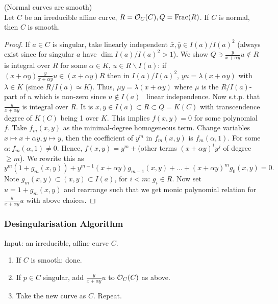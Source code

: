\documentclass[a4paper,11pt]{article}
\begin{document}
			\begin{thm}(Normal curves are smooth)\\
				Let $C$ be an irreducible affine curve, $R=\mathcal{O}_C(C), Q=\operatorname{Frac}(R)$. If $C$ is normal, then $C$ is smooth.
			\end{thm}
			\begin{proof}
				If $a\in C$ is singular, take linearly independent $\bar{x}, \bar{y}\in I(a)/I(a)^2$ (always exist since for singular $a$ have $\dim I(a)/I(a)^2>1$). We show $Q\ni\frac{y}{x+\alpha y}u\notin R$ is integral over $R$ for some $\alpha\in K$, $u\in R\backslash I(a)$: if $(x+\alpha y)\frac{y}{x+\alpha y}u\in (x+\alpha y)R$ then in $I(a)/I(a)^2$, $yu=\lambda(x+\alpha y)$ with $\lambda\in K$ (since $R/I(a)\simeq K$). Thus, $\mu y=\lambda(x+\alpha y)$ where $\mu$ is the $R/I(a)$-part of $u$ which is non-zero since $u\notin I(a)$ \contradiction\ linear independence. Now s.t.p. that $\frac{y}{x+\alpha y}$ is integral over $R$. It is $x,y\in I(a)\subset R\subset Q=K(C)$ with transcendence degree of $K(C)$ being 1 over $K$. This implies $f(x,y)=0$ for some polynomial $f$. Take $f_m(x,y)$ as the minimal-degree homogeneous term. Change variables $x\mapsto x+\alpha y, y\mapsto y$, then the coefficient of $y^m$ in $f_m(x,y)$ is $f_m(\alpha,1)$. For some $\alpha: f_m(\alpha,1)\neq0$. Hence, $f(x,y)=y^m+$(other terms $(x+\alpha y)^iy^j$ of degree $\ge m$). We rewrite this as 
				\begin{equation*}
					y^m(1+g_m(x,y))+y^{m-1}(x+\alpha y)g_{m-1}(x,y)+\dots+(x+\alpha y)^mg_0(x,y)=0.
				\end{equation*}
				Note $g_m(x,y)\subset(x,y)\subset I(a)$, for $i<m$: $g_i\in R$. Now set $u=1+g_m(x,y)$ and rearrange such that we get monic polynomial relation for $\frac{y}{x+\alpha y}u$ with above choices.
			\end{proof}

			\subsubsection*{Desingularisation Algorithm}

				Input: an irreducible, affine curve $C$.
				\begin{enumerate}
					\item If $C$ is smooth: done.
					\item If $p\in C$ singular, add $\frac{y}{x+\alpha y}u$ to $\mathcal{O}_C(C)$ as above.
					\item Take the new curve as $C$. Repeat.
				\end{enumerate}
\end{document}
